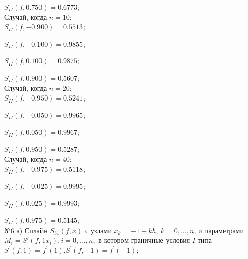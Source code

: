 \documentclass[rus, 12 pt]{article}
\begin{document}
    
    $S_{II}(f,0.750)=0.6773$;\\

    
    

    
    Случай, когда $n=10$:\\

    
    

    
    $S_{II}(f,-0.900)=0.5513$;

    
    $S_{II}(f,-0.100)=0.9855$;

    
    $S_{II}(f,0.100)=0.9875$;

    
    $S_{II}(f,0.900)=0.5607$;\\

    
    

    
    Случай, когда $n=20$:\\

    
    

    
    $S_{II}(f,-0.950)=0.5241$;

    
    $S_{II}(f,-0.050)=0.9965$;

    
    $S_{II}(f,0.050)=0.9967$;

    
    $S_{II}(f,0.950)=0.5287$;\\

    
    


    Случай, когда $n=40$:\\

    
    

    
    $S_{II}(f,-0.975)=0.5118$;

    
    $S_{II}(f,-0.025)=0.9995$;

    
    $S_{II}(f,0.025)=0.9993$;

    
    $S_{II}(f,0.975)=0.5145$;\\

    
    

    
    №6 а) Сплайн \(S_{31}(f,x)\) с узлами \(x_k=-1+kh,\:k=0,\ldots,n\), и
параметрами \(M_i=S'(f,1x_i),i=0,\ldots,n,\) в котором граничные условия
\(I\) типа - \(S^{'}(f,1)=f^{'}(1)\),\(S^{'}(f,-1)=f^{'}(-1);\)
\end{document}
